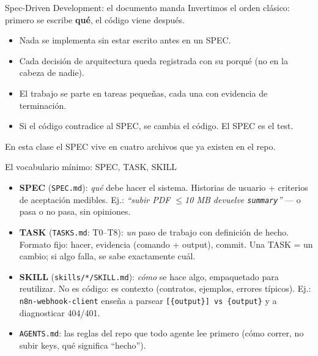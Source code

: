 \documentclass[aspectratio=169,11pt]{beamer}
\begin{document}
\begin{frame}{Spec-Driven Development: el documento manda}
  Invertimos el orden clásico: primero se escribe \textbf{qué}, el código viene después.
  \begin{itemize}
    \item Nada se implementa sin estar escrito antes en un SPEC.
    \item Cada decisión de arquitectura queda registrada con su porqué (no en la cabeza de nadie).
    \item El trabajo se parte en tareas pequeñas, cada una con evidencia de terminación.
    \item Si el código contradice al SPEC, se cambia el código. El SPEC es el test.
  \end{itemize}
  En esta clase el SPEC vive en cuatro archivos que ya existen en el repo.
\end{frame}

\begin{frame}{El vocabulario mínimo: SPEC, TASK, SKILL}
  \begin{itemize}
    \item \textbf{SPEC} (\texttt{SPEC.md}): \textit{qué} debe hacer el sistema. Historias de usuario + criterios de aceptación medibles. Ej.: \textit{``subir PDF $\le$10 MB devuelve \texttt{summary}''} --- o pasa o no pasa, sin opiniones.
    \item \textbf{TASK} (\texttt{TASKS.md}: T0--T8): \textit{un} paso de trabajo con definición de hecho. Formato fijo: hacer, evidencia (comando + output), commit. Una TASK = un cambio; si algo falla, se sabe exactamente cuál.
    \item \textbf{SKILL} (\texttt{skills/*/SKILL.md}): \textit{cómo} se hace algo, empaquetado para reutilizar. No es código: es contexto (contratos, ejemplos, errores típicos). Ej.: \texttt{n8n-webhook-client} enseña a parsear \texttt{[\{output\}] vs \{output\}} y a diagnosticar 404/401.
    \item \texttt{AGENTS.md}: las reglas del repo que todo agente lee primero (cómo correr, no subir keys, qué significa ``hecho'').
  \end{itemize}
\end{frame}
\end{document}

